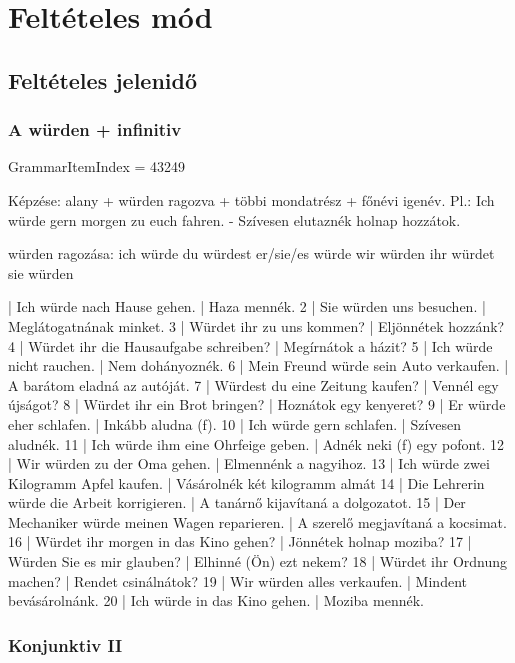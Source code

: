 \documentclass{article}
\newenvironment{desc}{\verbatim}{\endverbatim}
\newenvironment{exmp}{\verbatim}{\endverbatim}
\begin{document}
\section{Feltételes mód}

\subsection{Feltételes jelenidő}

\subsubsection{A würden + infinitiv}

GrammarItemIndex = 43249

\begin{desc}
Képzése: alany + würden ragozva + többi mondatrész + főnévi igenév.
Pl.: Ich würde gern morgen zu euch fahren. - Szívesen elutaznék holnap hozzátok.

würden ragozása:
ich würde
du würdest
er/sie/es würde
wir würden
ihr würdet
sie würden
\end{desc}

\begin{exmp}
1 | Ich würde nach Hause gehen. | Haza mennék.
2 | Sie würden uns besuchen. | Meglátogatnának minket.
3 | Würdet ihr zu uns kommen? | Eljönnétek hozzánk?
4 | Würdet ihr die Hausaufgabe schreiben? | Megírnátok a házit?
5 | Ich würde nicht rauchen. | Nem dohányoznék.
6 | Mein Freund würde sein Auto verkaufen. | A barátom eladná az autóját.
7 | Würdest du eine Zeitung kaufen? | Vennél egy újságot?
8 | Würdet ihr ein Brot bringen? | Hoznátok egy kenyeret?
9 | Er würde eher schlafen. | Inkább aludna (f).
10 | Ich würde gern schlafen. | Szívesen aludnék.
11 | Ich würde ihm eine Ohrfeige geben. | Adnék neki (f) egy pofont.
12 | Wir würden zu der Oma gehen. | Elmennénk a nagyihoz.
13 | Ich würde zwei Kilogramm Apfel kaufen. | Vásárolnék két kilogramm almát
14 | Die Lehrerin würde die Arbeit korrigieren. | A tanárnő kijavítaná a dolgozatot.
15 | Der Mechaniker würde meinen Wagen reparieren. | A szerelő megjavítaná a kocsimat.
16 | Würdet ihr morgen in das Kino gehen? | Jönnétek holnap moziba?
17 | Würden Sie es mir glauben? | Elhinné (Ön) ezt nekem?
18 | Würdet ihr Ordnung machen? | Rendet csinálnátok?
19 | Wir würden alles verkaufen. | Mindent bevásárolnánk.
20 | Ich würde in das Kino gehen. | Moziba mennék.
\end{exmp}

\subsubsection{Konjunktiv II}
\end{document}
